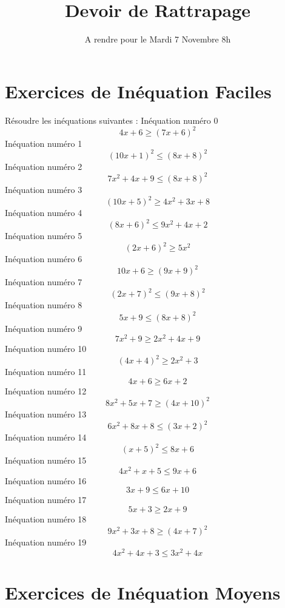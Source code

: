 \documentclass{article}
\title{Devoir de Rattrapage}
\date{A rendre pour le Mardi 7 Novembre 8h}\usepackage{natbib}
\begin{document}
\maketitle
 \section{Exercices de In\'equation Faciles}

 R\'esoudre les in\'equations suivantes : 
In\'equation num\'ero 0 \[4 x + 6 \geq \left(7 x + 6\right)^{2}\]In\'equation num\'ero 1 \[\left(10 x + 1\right)^{2} \leq \left(8 x + 8\right)^{2}\]In\'equation num\'ero 2 \[7 x^{2} + 4 x + 9 \leq \left(8 x + 8\right)^{2}\]In\'equation num\'ero 3 \[\left(10 x + 5\right)^{2} \geq 4 x^{2} + 3 x + 8\]In\'equation num\'ero 4 \[\left(8 x + 6\right)^{2} \leq 9 x^{2} + 4 x + 2\]In\'equation num\'ero 5 \[\left(2 x + 6\right)^{2} \geq 5 x^{2}\]In\'equation num\'ero 6 \[10 x + 6 \geq \left(9 x + 9\right)^{2}\]In\'equation num\'ero 7 \[\left(2 x + 7\right)^{2} \leq \left(9 x + 8\right)^{2}\]In\'equation num\'ero 8 \[5 x + 9 \leq \left(8 x + 8\right)^{2}\]In\'equation num\'ero 9 \[7 x^{2} + 9 \geq 2 x^{2} + 4 x + 9\]In\'equation num\'ero 10 \[\left(4 x + 4\right)^{2} \geq 2 x^{2} + 3\]In\'equation num\'ero 11 \[4 x + 6 \geq 6 x + 2\]In\'equation num\'ero 12 \[8 x^{2} + 5 x + 7 \geq \left(4 x + 10\right)^{2}\]In\'equation num\'ero 13 \[6 x^{2} + 8 x + 8 \leq \left(3 x + 2\right)^{2}\]In\'equation num\'ero 14 \[\left(x + 5\right)^{2} \leq 8 x + 6\]In\'equation num\'ero 15 \[4 x^{2} + x + 5 \leq 9 x + 6\]In\'equation num\'ero 16 \[3 x + 9 \leq 6 x + 10\]In\'equation num\'ero 17 \[5 x + 3 \geq 2 x + 9\]In\'equation num\'ero 18 \[9 x^{2} + 3 x + 8 \geq \left(4 x + 7\right)^{2}\]In\'equation num\'ero 19 \[4 x^{2} + 4 x + 3 \leq 3 x^{2} + 4 x\]
 \section{Exercices de In\'equation Moyens}
\end{document}
